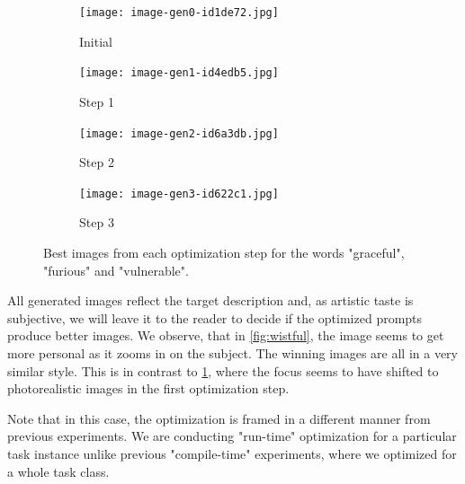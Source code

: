 \begin{figure}[htbp]
    \centering

    \begin{subfigure}{0.24\linewidth}
        \texttt{[image: image-gen0-id1de72.jpg]}
        \caption{Initial}
    \end{subfigure}
    \hfill
    \begin{subfigure}{0.24\linewidth}
        \texttt{[image: image-gen1-id4edb5.jpg]}
        \caption{Step 1}
    \end{subfigure}
    \hfill
    \begin{subfigure}{0.24\linewidth}
        \texttt{[image: image-gen2-id6a3db.jpg]}
        \caption{Step 2}
    \end{subfigure}
    \hfill
    \begin{subfigure}{0.24\linewidth}
        \texttt{[image: image-gen3-id622c1.jpg]}
        \caption{Step 3}
    \end{subfigure}

    \caption{Best images from each optimization step for the words "graceful", "furious" and "vulnerable".}
    \label{fig:graceful}
\end{figure}

All generated images reflect the target description and, as artistic taste is subjective, we will leave it to the reader 
to decide if the optimized prompts produce better images. We observe, that in \ref{fig:wistful}, the image seems to get more personal as it zooms in on the subject.
The winning images are all in a very similar style. This is in contrast to \ref{fig:graceful}, where the focus seems to have shifted to 
photorealistic images in the first optimization step.

Note that in this case, the optimization is framed in a different manner from previous experiments.
We are conducting "run-time" optimization for a particular task instance unlike previous "compile-time" experiments, where we optimized for a whole task class.
